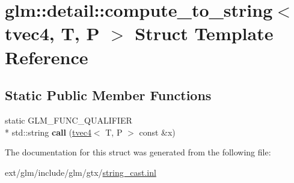 \hypertarget{structglm_1_1detail_1_1compute__to__string_3_01tvec4_00_01_t_00_01_p_01_4}{\section{glm\-:\-:detail\-:\-:compute\-\_\-to\-\_\-string$<$ tvec4, T, P $>$ Struct Template Reference}
\label{structglm_1_1detail_1_1compute__to__string_3_01tvec4_00_01_t_00_01_p_01_4}
}
\subsection*{Static Public Member Functions}
\begin{DoxyCompactItemize}
\item 
\hypertarget{structglm_1_1detail_1_1compute__to__string_3_01tvec4_00_01_t_00_01_p_01_4_aa91e3c2d9b945aaf2dd840690de03437}{static G\-L\-M\-\_\-\-F\-U\-N\-C\-\_\-\-Q\-U\-A\-L\-I\-F\-I\-E\-R \\*
std\-::string {\bfseries call} (\hyperlink{structglm_1_1tvec4}{tvec4}$<$ T, P $>$ const \&x)}\label{structglm_1_1detail_1_1compute__to__string_3_01tvec4_00_01_t_00_01_p_01_4_aa91e3c2d9b945aaf2dd840690de03437}

\end{DoxyCompactItemize}


The documentation for this struct was generated from the following file\-:\begin{DoxyCompactItemize}
\item 
ext/glm/include/glm/gtx/\hyperlink{string__cast_8inl}{string\-\_\-cast.\-inl}\end{DoxyCompactItemize}
